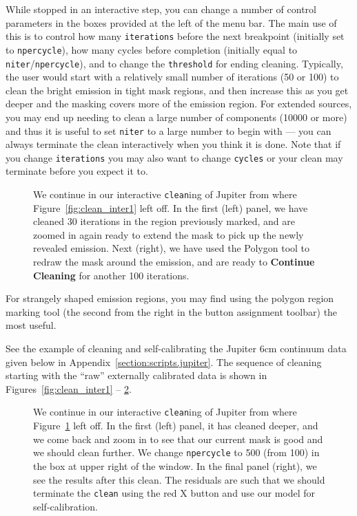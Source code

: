 While stopped in an interactive step, you can change a number of
control parameters in the boxes provided at the left of the menu
bar.  The main use of this is
to control how many {\tt iterations} before the next breakpoint
(initially set to {\tt npercycle}), how many cycles before completion
(initially equal to {\tt niter}/{\tt npercycle}), and to
change the {\tt threshold} for ending cleaning.  
Typically, the user would start
with a relatively small number of iterations (50 or 100) to clean the
bright emission in tight mask regions, and then increase this as you
get deeper and the masking covers more of the emission region.  For
extended sources, you may end up needing to clean a large number
of components (10000 or more) and thus it is useful to set {\tt niter}
to a large number to begin with --- you can always terminate the 
clean interactively when you think it is done.  Note that if you
change {\tt iterations} you may also want to change {\tt cycles} or
your clean may terminate before you expect it to.

\begin{figure}[h!]
\begin{center}
\caption{\label{fig:clean_inter2} We continue in our interactive 
{\tt clean}ing of Jupiter from where Figure~\ref{fig:clean_inter1}
left off.  In the first (left) panel, we have cleaned 30 iterations
in the region previously marked, and are zoomed in again ready to
extend the mask to pick up the newly revealed emission. 
Next (right), we have used the Polygon
tool to redraw the mask around the emission, and are ready to 
{\bf Continue Cleaning} for another 100 iterations.} 
\hrulefill
\end{center}
\end{figure}

For strangely shaped emission regions, you may find using the polygon
region marking tool (the second from the right in the button
assignment toolbar) the most useful.

See the example of cleaning and self-calibrating the Jupiter 6cm continuum
data given below in Appendix~\ref{section:scripts.jupiter}.  
The sequence of cleaning starting with the ``raw'' externally
calibrated data is shown in
Figures~\ref{fig:clean_inter1} -- \ref{fig:clean_inter3}.

\begin{figure}[h!]
\begin{center}
\caption{\label{fig:clean_inter3} We continue in our interactive 
{\tt clean}ing of Jupiter from where Figure~\ref{fig:clean_inter2}
left off.  In the first (left) panel,  it has cleaned deeper, and
we come back and zoom in to see that our current mask is good and
we should clean further.  We change {\tt npercycle} to 500 (from 100)
in the box at upper right of the window.  In the final panel (right),
we see the results after this clean.  The residuals are such that we
should terminate the {\tt clean} using the red X button 
and use our model for self-calibration.} 
\hrulefill
\end{center}
\end{figure}

